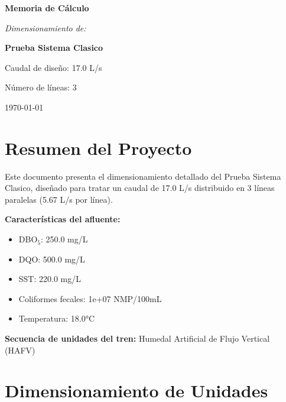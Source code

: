 \documentclass[12pt,a4paper]{article}
\begin{document}
\begin{titlepage}
\centering
\vspace*{2cm}

{\Huge\bfseries Memoria de Cálculo\par}
\vspace{1.5cm}

{\Large\itshape Dimensionamiento de:\par}
\vspace{0.5cm}

{\LARGE\bfseries Prueba Sistema Clasico\par}
\vspace{2cm}

{\large Caudal de diseño: 17.0 L/s\par}
{\large Número de líneas: 3\par}
\vfill
{\large\today\par}
\end{titlepage}

\tableofcontents

\listoffigures

\listoftables

\newpage
\section{Resumen del Proyecto}

Este documento presenta el dimensionamiento detallado del Prueba Sistema Clasico, diseñado para tratar un caudal de 17.0 L/s distribuido en 3 líneas paralelas (5.67 L/s por línea).

\textbf{Características del afluente:}
\begin{itemize}
    \item DBO$_5$: 250.0 mg/L
    \item DQO: 500.0 mg/L
    \item SST: 220.0 mg/L
    \item Coliformes fecales: 1e+07 NMP/100mL
    \item Temperatura: 18.0°C
\end{itemize}

\textbf{Secuencia de unidades del tren:} 
Humedal Artificial de Flujo Vertical (HAFV)

\section{Dimensionamiento de Unidades}

\newpage
\end{document}
